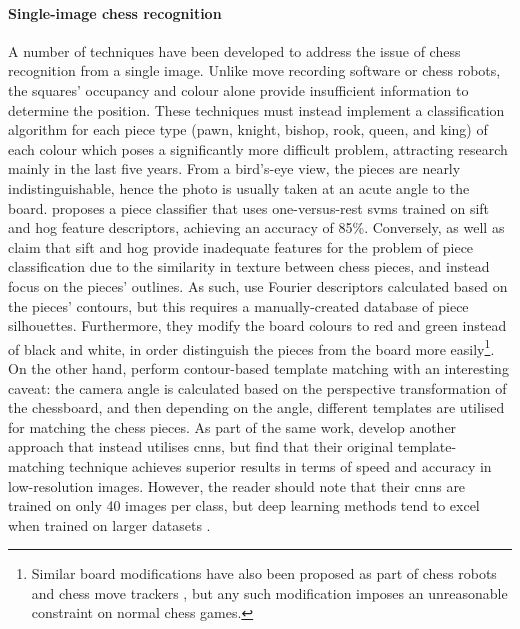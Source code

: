\paragraph{Single-image chess recognition}
A number of techniques have been developed to address the issue of chess recognition from a single image. 
Unlike move recording software or chess robots, the squares' occupancy and colour alone provide insufficient information to determine the position. 
These techniques must instead implement a classification algorithm for each piece type (pawn, knight, bishop, rook, queen, and king) of each colour which poses a significantly more difficult problem, attracting research mainly in the last five years.
From a bird's-eye view, the pieces are nearly indistinguishable, hence the photo is usually taken at an acute angle to the board.
\textcite{ding2016} proposes a piece classifier that uses one-versus-rest \glspl{svm} trained on \gls{sift} and \gls{hog} feature descriptors, achieving an accuracy of 85\%. 
Conversely, \textcite{danner2015} as well as \textcite{xie2018} claim that \gls{sift} and \gls{hog} provide inadequate features for the problem of piece classification due to the similarity in texture between chess pieces, and instead focus on the pieces' outlines.
As such, \textcite{danner2015} use Fourier descriptors calculated based on the pieces' contours, but this requires a manually-created database of piece silhouettes.
Furthermore, they modify the board colours to red and green instead of black and white, in order distinguish the pieces from the board more easily\footnote{Similar board modifications have also been proposed as part of chess robots \cite{banerjee2012} and chess move trackers \cite{wang2013}, but any such modification imposes an unreasonable constraint on normal chess games.}.
On the other hand, \textcite{xie2018} perform contour-based template matching with an interesting caveat: the camera angle is calculated based on the perspective transformation of the chessboard, and then depending on the angle, different templates are utilised for matching the chess pieces.
As part of the same work, \citeauthor{xie2018} develop another approach that instead utilises \glspl{cnn}, but find that their original template-matching technique achieves superior results in terms of speed and accuracy in low-resolution images.
However, the reader should note that their \glspl{cnn} are trained on only 40 images per class, but deep learning methods tend to excel when trained on larger datasets \cite{halevy2009}.

